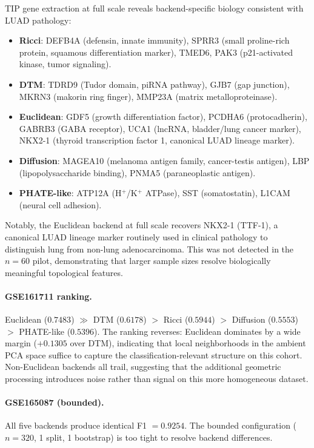 \documentclass[11pt]{article}
\begin{document}
TIP gene extraction at full scale reveals backend-specific biology consistent with LUAD pathology:
\begin{itemize}[leftmargin=1.5em]
\item \textbf{Ricci}: DEFB4A (defensin, innate immunity), SPRR3 (small proline-rich protein, squamous differentiation marker), TMED6, PAK3 (p21-activated kinase, tumor signaling).
\item \textbf{DTM}: TDRD9 (Tudor domain, piRNA pathway), GJB7 (gap junction), MKRN3 (makorin ring finger), MMP23A (matrix metalloproteinase).
\item \textbf{Euclidean}: GDF5 (growth differentiation factor), PCDHA6 (protocadherin), GABRB3 (GABA receptor), UCA1 (lncRNA, bladder/lung cancer marker), NKX2-1 (thyroid transcription factor 1, canonical LUAD lineage marker).
\item \textbf{Diffusion}: MAGEA10 (melanoma antigen family, cancer-testis antigen), LBP (lipopolysaccharide binding), PNMA5 (paraneoplastic antigen).
\item \textbf{PHATE-like}: ATP12A (H$^+$/K$^+$ ATPase), SST (somatostatin), L1CAM (neural cell adhesion).
\end{itemize}
Notably, the Euclidean backend at full scale recovers NKX2-1 (TTF-1), a canonical LUAD lineage marker routinely used in clinical pathology to distinguish lung from non-lung adenocarcinoma.
This was not detected in the $n = 60$ pilot, demonstrating that larger sample sizes resolve biologically meaningful topological features.

\paragraph{GSE161711 ranking.}
Euclidean ($0.7483$) $\gg$ DTM ($0.6178$) $>$ Ricci ($0.5944$) $>$ Diffusion ($0.5553$) $>$ PHATE-like ($0.5396$).
The ranking reverses: Euclidean dominates by a wide margin ($+0.1305$ over DTM), indicating that local neighborhoods in the ambient PCA space suffice to capture the classification-relevant structure on this cohort.
Non-Euclidean backends all trail, suggesting that the additional geometric processing introduces noise rather than signal on this more homogeneous dataset.

\paragraph{GSE165087 (bounded).}
All five backends produce identical F1 $= 0.9254$.
The bounded configuration ($n = 320$, 1 split, 1 bootstrap) is too tight to resolve backend differences.
\end{document}
